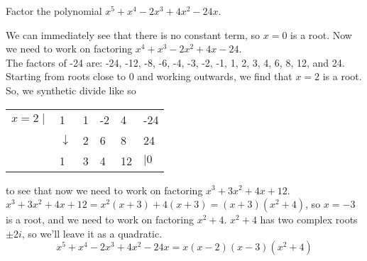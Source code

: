 \begin{example}
Factor the polynomial $x^5 + x^4 -2x^3 + 4x^2 -24x$.	
\end{example}
\noindent
We can immediately see that there is no constant term, so $x=0$ is a root. Now we need to work on factoring $x^4 + x^3 -2x^2 + 4x - 24$.\\
The factors of -24 are: -24, -12, -8, -6, -4, -3, -2, -1, 1, 2, 3, 4, 6, 8, 12, and 24. Starting from roots close to 0 and working outwards, we find that $x=2$ is a root. So, we synthetic divide like so
\begin{table}[H]
	\centering
	\begin{tabular}{llllll}
		$x=2 \mid$ & 1            & 1 & -2 & 4  & -24 \\
		& $\downarrow$ & 2 & 6  & 8  & 24  \\ \hline
		& 1            & 3 & 4  & 12 & $\mid 0$  
	\end{tabular}
\end{table}
\noindent
to see that now we need to work on factoring $x^3+3x^2+4x+12$.
$x^3+3x^2+4x+12 = x^2(x+3)+4(x+3) = (x+3)(x^2+4)$, so $x=-3$ is a root, and we need to work on factoring $x^2+4$.
$x^2+4$ has two complex roots $\pm 2i$, so we'll leave it as a quadratic.
\begin{equation*}	
	x^5 + x^4 -2x^3 + 4x^2 -24x = x(x-2)(x-3)(x^2+4)
\end{equation*}
